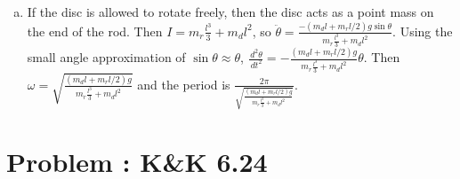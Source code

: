 \documentclass[solutions]{esg8012pset}
\renewcommand{\d}{\,d}
\begin{document}
\begin{enumerate}[(a)]
\begin{proof}
\begin{align*}
        & = \vec \omega \left( d^2 m_T +  I_{\ell_1} + 2\vec d \cdot \vec 0 \right) \\
        & = \vec \omega \left( d^2 m_T +  I_{\ell_1} \right) \\
        \\
        I_{\ell_2} & = I_{\ell_1} + d^2 m_T
      \end{align*}
    \end{proof}
    $\alpha = \ddot\theta = \frac{\d L / \d t}{I}$.  \begin{align*}
    I & = m_r\int_0^l r^2 \d r + m_d l^2 + \int_0^R \frac{m_d 2 \pi r}{\pi R^2} r^2 \d r \\
      & = m_r\frac{l^3}{3} + m_d l^2 + \frac{m_d 2}{R^2}\int_0^R r^3 \d r \\
      & = m_r\frac{l^3}{3} + m_d l^2 + \frac{m_d 2 R^4}{4 R^2} \\
      & = m_r\frac{l^3}{3} + m_d l^2 + \frac{m_d R^2}{2}
    \end{align*} Then $\ddot \theta = \frac{-(m_d l + m_r l / 2)g\sin\theta}{m_r\frac{l^3}{3} + m_d l^2 + \frac{m_d R^2}{2}}$.  Using the small angle approximation of $\sin\theta\approx \theta$, $\frac{\d^2 \theta}{\d t^2} = -\frac{(m_d l + m_r l / 2)g}{m_r\frac{l^3}{3} + m_d l^2 + \frac{m_d R^2}{2}}\theta$.  Then $\omega = \sqrt{\frac{(m_d l + m_r l / 2)g}{m_r\frac{l^3}{3} + m_d l^2 + \frac{m_d R^2}{2}}}$ and the period is $\frac{2\pi}{\sqrt{\frac{(m_d l + m_r l / 2)g}{m_r\frac{l^3}{3} + m_d l^2 + \frac{m_d R^2}{2}}}}$.
    \item If the disc is allowed to rotate freely, then the disc acts as a point mass on the end of the rod.  Then $I = m_r\frac{l^3}{3} + m_d l^2$, so $\ddot \theta = \frac{-(m_d l + m_r l / 2)g\sin\theta}{m_r\frac{l^3}{3} + m_d l^2}$.  Using the small angle approximation of $\sin\theta\approx \theta$, $\frac{\d^2 \theta}{\d t^2} = -\frac{(m_d l + m_r l / 2)g}{m_r\frac{l^3}{3} + m_d l^2}\theta$.  Then $\omega = \sqrt{\frac{(m_d l + m_r l / 2)g}{m_r\frac{l^3}{3} + m_d l^2}}$ and the period is $\frac{2\pi}{\sqrt{\frac{(m_d l + m_r l / 2)g}{m_r\frac{l^3}{3} + m_d l^2}}}$.
  \end{enumerate}
\section{Problem \thesection: K\&K 6.24}
\end{document}
